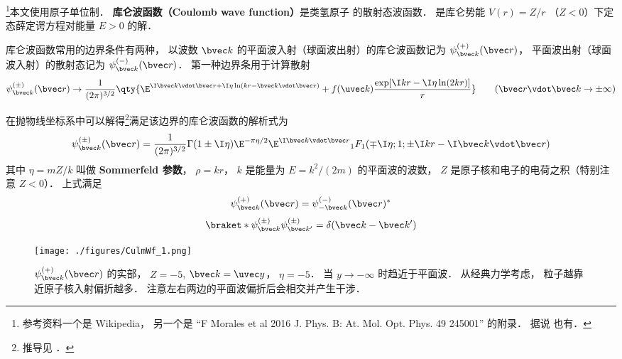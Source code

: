 

\footnote{参考资料一个是 Wikipedia， 另一个是 “F Morales et al 2016 J. Phys. B: At. Mol. Opt. Phys. 49 245001” 的附录． 据说 \cite{Merzbacher} 也有．}本文使用原子单位制． \textbf{库仑波函数（Coulomb wave function）}是类氢原子%
的散射态波函数． %
是库仑势能 $V(r) = Z/r$ （$Z < 0$）下定态薛定谔方程对能量 $E > 0$ 的解．

库仑波函数常用的边界条件有两种， 以波数 $\bvec k$ 的平面波入射（球面波出射）的库仑波函数记为 $\psi_{\bvec k}^{(+)}(\bvec r)$， 平面波出射（球面波入射）的散射态记为 $\psi_{\bvec k}^{(-)}(\bvec r)$． 第一种边界条用于计算散射
\begin{equation}\label{CulmWf_eq4}
\psi_{\bvec k}^{(\pm)}(\bvec r) \to \frac{1}{(2\pi)^{3/2}} \qty{\E^{\I\bvec k\vdot\bvec r + \I\eta\ln (kr - \bvec k \vdot\bvec r)}
+ f(\uvec k) \frac{\exp[\I kr - \I\eta \ln(2kr)]}{r}}
\qquad
(\bvec r\vdot \bvec k \to \pm\infty)
\end{equation}

在抛物线坐标系中可以解得\footnote{推导见 \cite{Brandsen}．}满足该边界的库仑波函数的解析式为
\begin{equation}\label{CulmWf_eq7}
\psi_{\bvec k}^{(\pm)}(\bvec r) = \frac{1}{(2\pi)^{3/2}} \Gamma(1\pm \I\eta)\E^{-\pi\eta/2} \E^{\I\bvec k\vdot\bvec r} {_1F_1}(\mp\I\eta; 1; \pm\I kr - \I \bvec k\vdot \bvec r)
\end{equation}
其中 $\eta = mZ/k$ 叫做 \textbf{Sommerfeld 参数}， $\rho = kr$， $k$ 是能量为 $E = k^2/(2m)$ 的平面波的波数， $Z$ 是原子核和电子的电荷之积（特别注意 $Z < 0$）． 上式满足
\begin{equation}
\psi_{\bvec k}^{(+)}(\bvec r) = \psi_{-\bvec k}^{(-)}(\bvec r)^*
\end{equation}
\begin{equation}
\braket*{\psi_{\bvec k}^{(\pm)}}{\psi_{\bvec k'}^{(\pm)}} = \delta(\bvec k - \bvec k')
\end{equation}

\begin{figure}[ht]
\centering
\texttt{[image: ./figures/CulmWf\_1.png]} %
\caption{$\psi_{\bvec k}^{(+)}(\bvec r)$ 的实部， $Z = -5$, $\bvec k = \uvec y$， $\eta = -5$． 当 $y \to -\infty$ 时趋近于平面波． 从经典力学考虑， 粒子越靠近原子核入射偏折越多． 注意左右两边的平面波偏折后会相交并产生干涉．} \label{CulmWf_fig2}
\end{figure}

